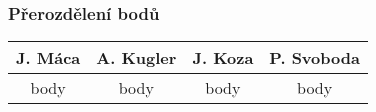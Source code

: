 \documentclass{beamer}
\begin{document}
\begin{frame}[allowframebreaks]\frametitle{Přerozdělení bodů}
    
    \begin{center}
  \begin{tabular}{| c | c | c | c |}
    \hline
     J. Máca & A. Kugler & J. Koza & P. Svoboda \\
    \hline
     body & body & body & body \\
    \hline
  \end{tabular}     
   \end{center}
\end{frame}
\end{document}
